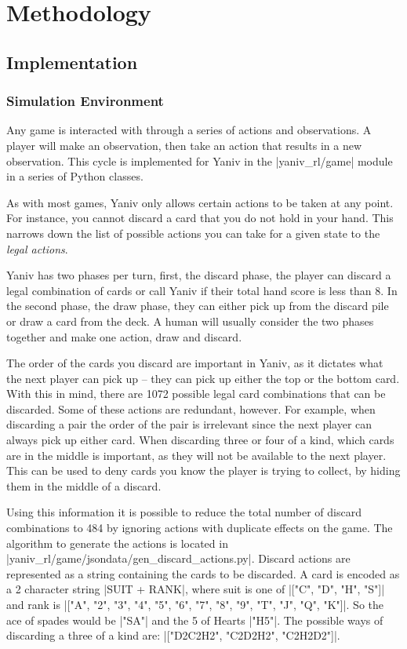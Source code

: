 \documentclass[../main.tex]{subfiles}
\begin{document}
\chapter{Methodology}
\label{cha:Methodology}


\section{Implementation}
\subsection{Simulation Environment}
Any game is interacted with through a series of actions and observations. A player will make an observation, then take an action that results in a new observation. This cycle is implemented for Yaniv in the |yaniv_rl/game| module in a series of Python classes. 

As with most games, Yaniv only allows certain actions to be taken at any point. For instance, you cannot discard a card that you do not hold in your hand. This narrows down the list of possible actions you can take for a given state to the \textit{legal actions}.

Yaniv has two phases per turn, first, the discard phase, the player can discard a legal combination of cards or call Yaniv if their total hand score is less than 8. In the second phase, the draw phase, they can either pick up from the discard pile or draw a card from the deck. A human will usually consider the two phases together and make one action, draw and discard. 

The order of the cards you discard are important in Yaniv, as it dictates what the next player can pick up -- they can pick up either the top or the bottom card. With this in mind, there are 1072 possible legal card combinations that can be discarded. Some of these actions are redundant, however. For example, when discarding a pair the order of the pair is irrelevant since the next player can always pick up either card. When discarding three or four of a kind, which cards are in the middle is important, as they will not be available to the next player. This can be used to deny cards you know the player is trying to collect, by hiding them in the middle of a discard. 

Using this information it is possible to reduce the total number of discard combinations to 484 by ignoring actions with duplicate effects on the game. The algorithm to generate the actions is located in |yaniv_rl/game/jsondata/gen_discard_actions.py|. Discard actions are represented as a string containing the cards to be discarded. A card is encoded as a 2 character string |SUIT + RANK|, where suit is one of |["C", "D", "H", "S"]| and rank is |["A", "2", "3", "4", "5", "6", "7", "8", "9", "T", "J", "Q", "K"]|. So the ace of spades would be |"SA"| and the 5 of Hearts |"H5"|. The possible ways of discarding a three of a kind are: |["D2C2H2", "C2D2H2", "C2H2D2"]|. 
\end{document}
